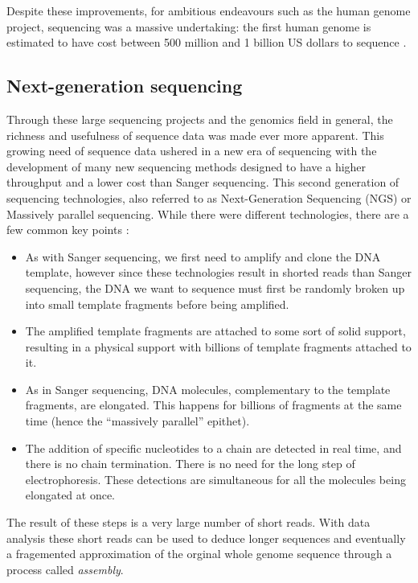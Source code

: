 \documentclass[
  11pt,
  twoside]{scrbook}
\begin{document}
Despite these improvements, for ambitious endeavours such as the human genome project, sequencing was a massive undertaking: the first human genome is estimated to have cost between 500 million and 1 billion US dollars to sequence \autocite{CostSequencingHuman}.

\hypertarget{next-generation-sequencing}{%
\subsection{Next-generation sequencing}\label{next-generation-sequencing}}

Through these large sequencing projects and the genomics field in general, the richness and usefulness of sequence data was made ever more apparent. This growing need of sequence data ushered in a new era of sequencing with the development of many new sequencing methods designed to have a higher throughput and a lower cost than Sanger sequencing. This second generation of sequencing technologies, also referred to as Next-Generation Sequencing (NGS) or Massively parallel sequencing. While there were different technologies, there are a few common key points \autocite{metzkerSequencingTechnologiesNext2010}:

\begin{itemize}
\item
  As with Sanger sequencing, we first need to amplify and clone the DNA template, however since these technologies result in shorted reads than Sanger sequencing, the DNA we want to sequence must first be randomly broken up into small template fragments before being amplified.
\item
  The amplified template fragments are attached to some sort of solid support, resulting in a physical support with billions of template fragments attached to it.
\item
  As in Sanger sequencing, DNA molecules, complementary to the template fragments, are elongated. This happens for billions of fragments at the same time (hence the ``massively parallel'' epithet).
\item
  The addition of specific nucleotides to a chain are detected in real time, and there is no chain termination. There is no need for the long step of electrophoresis. These detections are simultaneous for all the molecules being elongated at once.
\end{itemize}

The result of these steps is a very large number of short reads. With data analysis these short reads can be used to deduce longer sequences and eventually a fragemented approximation of the orginal whole genome sequence through a process called \emph{assembly}.
\end{document}

